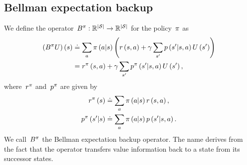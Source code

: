 \subsection{Bellman expectation backup}
We define the operator~${B^{\pi}:\mathbb{R}^{\left\lvert\mathcal{S}\right\rvert}\rightarrow\mathbb{R}^{\left\lvert\mathcal{S}\right\rvert}}$ for the policy~${\pi}$ as
\begin{align} \label{eq:bellman_expectation_backup}
	\left(\bellmanoperator\policyscript\valuevector\right)\left(\state\right)
		&\doteq\sum_{\action}\policy\left(\action\middle\vert\state\right)\left(\immediatereward\left(\state,\action\right)+\discount\sum_{\state'}\transition\left(\state'\middle\vert\state,\action\right)\valuevector\left(\state'\right)\right) \notag \\
		&=\immediatereward\policyscript\left(\state,\action\right)+\discount\sum_{\state'}\transition\policyscript\left(\state'\middle\vert\state,\action\right)\valuevector\left(\state'\right),
\end{align}
where~${r^{\pi}}$ and~${p^{\pi}}$ are given by
\begin{equation}
\begin{split}
	\immediatereward\policyscript\left(\state\right)&\doteq\sum_{\action}\policy\left(\action\middle\vert\state\right)\immediatereward\left(\state,\action\right), \\
	\transition\policyscript\left(\state'\middle\vert\state\right)&\doteq\sum_{\action}\policy\left(\action\middle\vert\state\right)\transition\left(\state'\middle\vert\state,\action\right).
\end{split}
\end{equation}
We call~${B^{\pi}}$ the Bellman expectation backup operator. The name derives from the fact that the operator transfers value information back to a state from its successor states.

